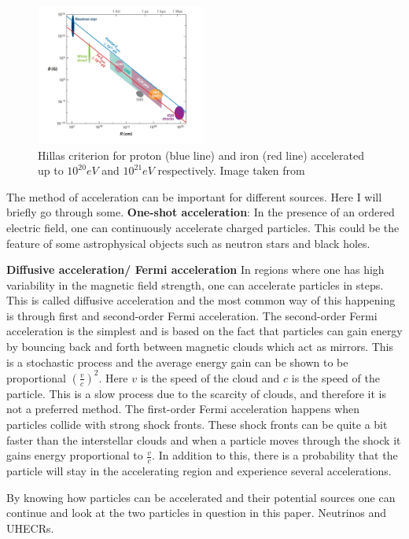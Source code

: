 \begin{figure}
    \centering
    \includegraphics[width = 0.5\textwidth]{hillas_criterion.jpeg}
    \caption{Hillas criterion for proton (blue line) and iron (red line) accelerated up to $10^{20}eV$ and $10^{21}eV$ respectively. Image taken from \cite{doi:10.1146/annurev-astro-081710-102620}}
    \label{fig:hillas_c}
\end{figure}

The method of acceleration can be important for different sources. Here I will briefly go through some. 
\textbf{One-shot acceleration}:
In the presence of an ordered electric field, one can continuously accelerate charged particles. This could be the feature of some astrophysical objects such as neutron stars and black holes.%


\textbf{Diffusive acceleration/ Fermi acceleration}
In regions where one has high variability in the magnetic field strength, one can accelerate particles in steps. 
This is called diffusive acceleration and the most common way of this happening is through first and second-order Fermi acceleration.
The second-order Fermi acceleration is the simplest and is based on the fact that particles can gain energy by bouncing back and forth between magnetic clouds which act as mirrors. 
This is a stochastic process and the average energy gain can be shown to be proportional $(\frac{v}{c})^2$. Here $v$ is the speed of the cloud 
and $c$ is the speed of the particle. This is a slow process due to the scarcity of clouds, and therefore it is not a preferred method.
The first-order Fermi acceleration happens when particles collide with strong shock fronts. These shock fronts can be quite a bit faster than the interstellar clouds
and when a particle moves through the shock it gains energy proportional to $\frac{v}{c}$. In addition to this, there is a probability that the particle will stay in the accelerating region and 
experience several accelerations. 

By knowing how particles can be accelerated and their potential sources one can continue and look at the two particles in question in this paper. 
Neutrinos and UHECRs.
